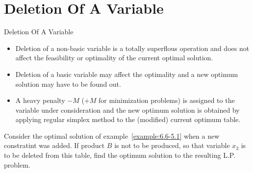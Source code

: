 
\section{Deletion Of A Variable}
\label{sec:deletion-variable}

\begin{frame}{Deletion Of A Variable}{}
  \begin{itemize} \justifying \parskip3mm
  \item Deletion of a \alert{non-basic variable} is a totally superflous operation and does not affect the feasibility or optimality of the current optimal solution.
  \item Deletion of a \alert{basic variable} may affect the optimality and a new optimum solution may have to be found out.
  \item A \alert{heavy penalty} $-M$ ($+M$ for minimization problems) is assigned to the variable under consideration and the new optimum solution is obtained by \alert{applying regular simplex method} to the (modified) current optimum table.
  \end{itemize}
\end{frame}

\begin{frameExample}{\label{example:6.6-6.1}}{}
  Consider the optimal solution of example~\ref{example:6.6-5.1} when a new  constratint was added. If product $B$ is not to be produced, so that variable $x_2$ is to be deleted from this table, find the optimum solution to the resulting L.P. problem.
  
\end{frameExample}


